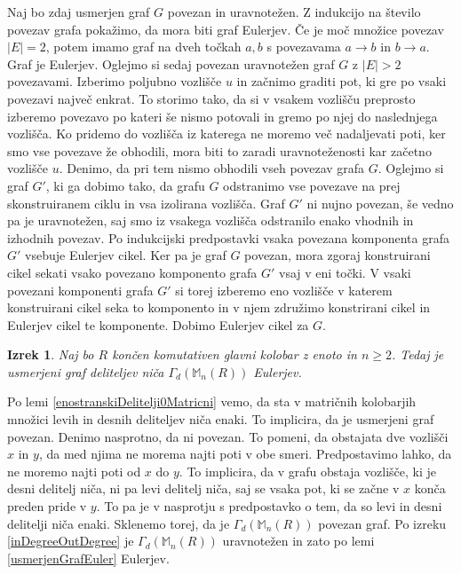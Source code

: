 \documentclass[a4paper, 12pt]{amsart}
\theoremstyle{definition} %
\theoremstyle{plain} %
\newtheorem{izrek}[definicija]{Izrek}
\newcommand{\M}{\mathbb M}
\begin{document}
Naj bo zdaj usmerjen graf $G$ povezan in uravnotežen. Z indukcijo na število povezav grafa pokažimo, da mora biti graf Eulerjev. Če je moč množice povezav $|E|=2$, potem imamo graf na dveh točkah $a,b$ s povezavama $a\rightarrow b$ in $b\rightarrow a$. Graf je Eulerjev. Oglejmo si sedaj povezan uravnotežen graf $G$ z $|E|> 2$ povezavami. Izberimo poljubno vozlišče $u$ in začnimo graditi pot, ki gre po vsaki povezavi največ enkrat. To storimo tako, da si v vsakem vozlišču preprosto izberemo povezavo po kateri še nismo potovali in gremo po njej do naslednjega vozlišča. Ko pridemo do vozlišča iz katerega ne moremo več nadaljevati poti, ker smo vse povezave že obhodili, mora biti to zaradi uravnoteženosti kar začetno vozlišče $u$. Denimo, da pri tem nismo obhodili vseh povezav grafa $G$. Oglejmo si graf $G'$, ki ga dobimo tako, da grafu $G$ odstranimo vse povezave na prej skonstruiranem ciklu in vsa izolirana vozlišča. Graf $G'$ ni nujno povezan, še vedno pa je uravnotežen, saj smo iz vsakega vozlišča odstranilo enako vhodnih in izhodnih povezav. Po indukcijski predpostavki vsaka povezana komponenta grafa $G'$ vsebuje Eulerjev cikel. Ker pa je graf $G$ povezan, mora zgoraj konstruirani cikel sekati vsako povezano komponento grafa $G'$ vsaj v eni točki. V vsaki povezani komponenti grafa $G'$ si torej izberemo eno vozlišče v katerem konstruirani cikel seka to komponento in v njem združimo konstrirani cikel in Eulerjev cikel te komponente. Dobimo Eulerjev cikel za $G$.
\endproof

\begin{izrek}
Naj bo $R$ končen komutativen glavni kolobar z enoto in $n\ge 2$. Tedaj je usmerjeni graf deliteljev niča $\Gamma_d(\M_n(R))$ Eulerjev.
\end{izrek}

\proof
Po lemi \ref{enostranskiDelitelji0Matricni} vemo, da sta v matričnih kolobarjih množici levih  in desnih deliteljev niča enaki. To implicira, da je usmerjeni graf povezan. Denimo nasprotno, da ni povezan. To pomeni, da obstajata dve vozlišči $x$ in $y$, da med njima ne morema najti poti v obe smeri. Predpostavimo lahko, da ne moremo najti poti od $x$ do $y$. To implicira, da v grafu obstaja vozlišče, ki je desni delitelj niča, ni pa levi delitelj niča, saj se vsaka pot, ki se začne v $x$ konča preden pride v $y$. To pa je v nasprotju s predpostavko o tem, da so levi in desni delitelji niča enaki. Sklenemo torej, da je $\Gamma_d(\M_n(R))$ povezan graf. Po izreku \ref{inDegreeOutDegree} je $\Gamma_d(\M_n(R))$ uravnotežen in zato po lemi \ref{usmerjenGrafEuler} Eulerjev.
\endproof
\end{document}
